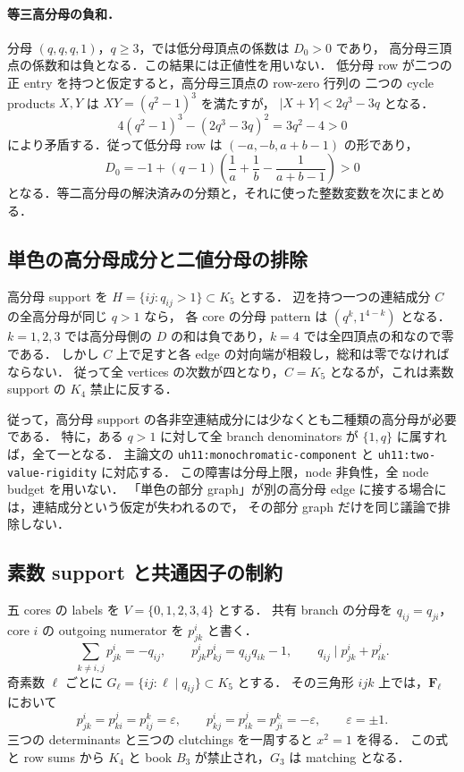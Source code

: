 \paragraph{等三高分母の負和．}
分母 $(q,q,q,1)$，$q\geq3$，では低分母頂点の係数は $D_0>0$ であり，
高分母三頂点の係数和は負となる．この結果には正値性を用いない．
低分母 row が二つの正 entry を持つと仮定すると，高分母三頂点の row-zero 行列の
二つの cycle products $X,Y$ は $XY=(q^2-1)^3$ を満たすが，
$|X+Y|<2q^3-3q$ となる．
\[
 4(q^2-1)^3-(2q^3-3q)^2=3q^2-4>0
\]
により矛盾する．従って低分母 row は $(-a,-b,a+b-1)$ の形であり，
\[
 D_0=-1+(q-1)\left(\frac1a+\frac1b-\frac1{a+b-1}\right)>0
\]
となる．等二高分母の解決済みの分類と，それに使った整数変数を次にまとめる．



\subsection{単色の高分母成分と二値分母の排除}

高分母 support を $H=\{ij:q_{ij}>1\}\subset K_5$ とする．
辺を持つ一つの連結成分 $C$ の全高分母が同じ $q>1$ なら，
各 core の分母 pattern は $(q^k,1^{4-k})$ となる．
$k=1,2,3$ では高分母側の $D$ の和は負であり，$k=4$ では全四頂点の和なので零である．
しかし $C$ 上で足すと各 edge の対向端が相殺し，総和は零でなければならない．
従って全 vertices の次数が四となり，$C=K_5$ となるが，これは素数 support の
$K_4$ 禁止に反する．

従って，高分母 support の各非空連結成分には少なくとも二種類の高分母が必要である．
特に，ある $q>1$ に対して全 branch denominators が $\{1,q\}$ に属すれば，全て一となる．
主論文の \texttt{uh11:monochromatic-component} と
\texttt{uh11:two-value-rigidity} に対応する．
この障害は分母上限，node 非負性，全 node budget を用いない．
「単色の部分 graph」が別の高分母 edge に接する場合には，連結成分という仮定が失われるので，
その部分 graph だけを同じ議論で排除しない．

\subsection{素数 support と共通因子の制約}

五 cores の labels を $V=\{0,1,2,3,4\}$ とする．
共有 branch の分母を $q_{ij}=q_{ji}$，core $i$ の outgoing numerator を $p^i_{jk}$ と書く．
\[
 \sum_{k\ne i,j}p^i_{jk}=-q_{ij},\qquad
 p^i_{jk}p^i_{kj}=q_{ij}q_{ik}-1,\qquad
 q_{ij}\mid p^i_{jk}+p^j_{ik}.
\]
奇素数 $\ell$ ごとに $G_\ell=\{ij:\ell\mid q_{ij}\}\subset K_5$ とする．
その三角形 $ijk$ 上では，$\mathbf F_\ell$ において
\[
 p^i_{jk}=p^j_{ki}=p^k_{ij}=\varepsilon,\qquad
 p^i_{kj}=p^j_{ik}=p^k_{ji}=-\varepsilon,
 \qquad\varepsilon=\pm1.
\]
三つの determinants と三つの clutchings を一周すると $x^2=1$ を得る．
この式と row sums から $K_4$ と book $B_3$ が禁止され，$G_3$ は matching となる．

